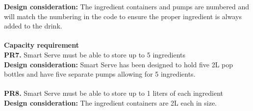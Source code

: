 \documentclass[12pt, titlepage]{article}
\begin{document}
        \indent\textbf{Design consideration:} The ingredient containers and pumps are numbered and will match the numbering in the code to ensure the proper ingredient is always added to the drink.\\\\
    \textbf{Capacity requirement}\\
        \noindent\textbf{PR7.} Smart Serve must be able to store up to 5 ingredients \\
        \indent\textbf{Design consideration:} Smart Serve has been designed to hold five 2L pop bottles and have five separate pumps allowing for 5 ingredients.\\\\
        \textbf{PR8.} Smart Serve must be able to store up to 1 liters of each ingredient \\
        \indent\textbf{Design consideration:} The ingredient containers are 2L each in size.
\end{document}
